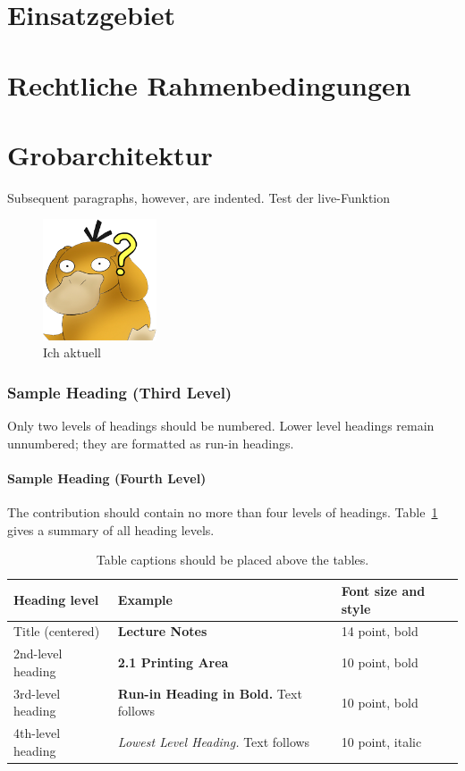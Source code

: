 \section{Einsatzgebiet}
\section{Rechtliche Rahmenbedingungen}
\section{Grobarchitektur}

Subsequent paragraphs, however, are indented. Test der live-Funktion
\begin{figure}[ht]
    \begin{center}
        \includegraphics[width = 0.3\textwidth]{Bilder/enton.png}
        \caption{Ich aktuell}
    \end{center}
\end{figure}

\subsubsection{Sample Heading (Third Level)} Only two levels of
headings should be numbered. Lower level headings remain unnumbered;
they are formatted as run-in headings.


\paragraph{Sample Heading (Fourth Level)}
The contribution should contain no more than four levels of
headings. Table~\ref{tab1} gives a summary of all heading levels.

\begin{table}
    \caption{Table captions should be placed above the
        tables.}\label{tab1}
    \begin{tabular}{|l|l|l|}
        \hline
        Heading level     & Example                                          & Font size and style \\
        \hline
        Title (centered)  & {\Large\bfseries Lecture Notes}                  & 14 point, bold      \\
        2nd-level heading & {\bfseries 2.1 Printing Area}                    & 10 point, bold      \\
        3rd-level heading & {\bfseries Run-in Heading in Bold.} Text follows & 10 point, bold      \\
        4th-level heading & {\itshape Lowest Level Heading.} Text follows    & 10 point, italic    \\
        \hline
    \end{tabular}
\end{table}